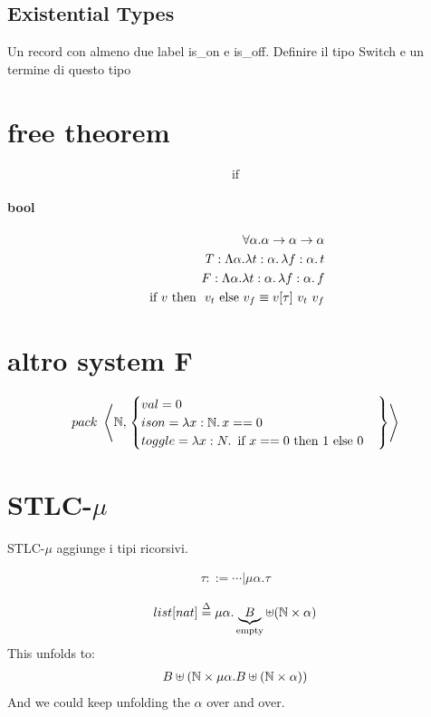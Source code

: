 \documentclass{article}
\newcommand{\N}{\ensuremath \mathbb N}
\newcommand{\IF}[0]{\ensuremath {\text{ if }}}
\newcommand{\THEN}[0]{\ensuremath {\text{ then }}}
\newcommand{\ELSE}[0]{\ensuremath {\text{ else }}}
\begin{document}
\subsection{Existential Types}

Un record con almeno due label is\_on e is\_off. 
Definire il tipo Switch e un termine di questo tipo

\section{free theorem}
\begin{align*}
    \IF 
\end{align*}

\paragraph{bool}
\begin{align*}
    \forall\alpha.\alpha\to\alpha\to\alpha \\
    T: \Lambda\alpha.\lam{t:\alpha}\lam{f:\alpha}{t} \\
    F: \Lambda\alpha.\lam{t:\alpha}\lam{f:\alpha}{f} \\
    \IF v \THEN\ v_t \ELSE v_f \equiv v[\tau]\ v_t\ v_f
\end{align*}

\section{altro system F}
\begin{align*}
    pack\ \left\langle\N,\left.\begin{cases}val=0\\ison=\lam{x:\N}{x==0}\\toggle=\lam{x:N}{\IF x==0\THEN 1 \ELSE 0}\end{cases}\right\}\right\rangle
\end{align*}

\section{STLC-$\mu$}
STLC-$\mu$ aggiunge i tipi ricorsivi.

\begin{align*}
    \tau ::= \cdots | \mu\alpha.\tau
\end{align*}

\begin{align*}
    list[nat] \overset{\Delta}{=}\mu\alpha.\underbrace{B}_\text{empty}\uplus(\N\times\alpha)
\end{align*}
This unfolds to:
\begin{gather*}
    B\uplus(\N\times \mu\alpha. B\uplus(\N\times\alpha))
\end{gather*}
And we could keep unfolding the $\alpha$ over and over.
\end{document}
